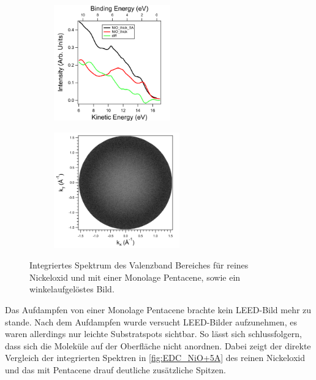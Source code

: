        \begin{figure}
            \centering
            \begin{subfigure}[t]{0.48\textwidth}
                \centering
                \includegraphics[height=5cm]{./content/pictures/NiO+5A/NiO_thick_5A.png}
                \label{fig:EDC_NiO+5A}
            \end{subfigure}
            \begin{subfigure}[t]{0.48\textwidth}
                \centering
                \includegraphics[height=5cm]{./content/pictures/NiO+5A/NiO_thick_5A_KE12_7.png}
                \label{fig:NiO+5A}
            \end{subfigure}
            \caption{Integriertes Spektrum des Valenzband Bereiches für reines Nickeloxid und mit einer Monolage Pentacene, sowie ein winkelaufgelöstes Bild.}
        \end{figure}
        Das Aufdampfen von einer Monolage Pentacene brachte kein LEED-Bild mehr zu stande.
        Nach dem Aufdampfen wurde versucht LEED-Bilder aufzunehmen, es waren allerdings nur leichte Substratspots sichtbar.
        So lässt sich schlussfolgern, dass sich die Moleküle auf der Oberfläche nicht anordnen.
        Dabei zeigt der direkte Vergleich der integrierten Spektren in \autoref{fig:EDC_NiO+5A} des reinen Nickeloxid und das mit Pentacene drauf deutliche zusätzliche Spitzen.
